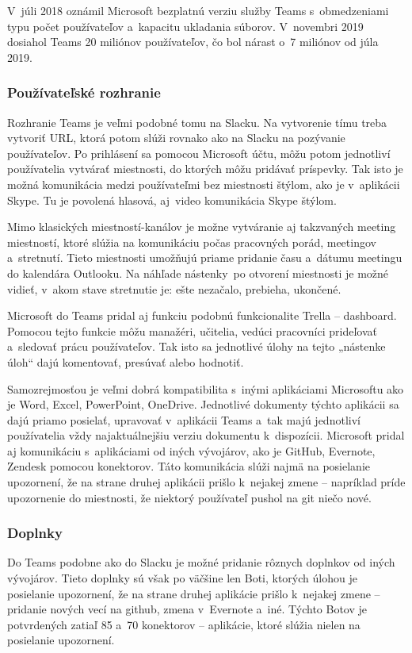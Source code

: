 \indent V júli 2018 oznámil Microsoft bezplatnú verziu služby Teams s obmedzeniami typu počet používateľov a kapacitu ukladania súborov. V novembri 2019 dosiahol Teams 20 miliónov používateľov, čo bol nárast o 7 miliónov od júla 2019. 
\subsubsection{Používateľské rozhranie}
\indent Rozhranie Teams je veľmi podobné tomu na Slacku. Na vytvorenie tímu treba vytvoriť URL, ktorá potom slúži rovnako ako na Slacku na pozývanie používateľov. Po prihlásení sa pomocou Microsoft účtu, môžu potom jednotliví používatelia vytvárať miestnosti, do ktorých môžu pridávať príspevky. Tak isto je možná komunikácia medzi používateľmi bez miestnosti štýlom, ako je v aplikácii Skype. Tu je povolená hlasová, aj video komunikácia Skype štýlom. 

\indent Mimo klasických miestností-kanálov je možne vytváranie aj takzvaných meeting miestností, ktoré slúžia na komunikáciu počas pracovných porád, meetingov a stretnutí. Tieto miestnosti umožňujú priame pridanie času a dátumu meetingu do kalendára Outlooku. Na náhľade nástenky po otvorení miestnosti je možné vidieť, v akom stave stretnutie je: ešte nezačalo, prebieha, ukončené. 

\indent Microsoft do Teams pridal aj funkciu podobnú funkcionalite Trella – dashboard. Pomocou tejto funkcie môžu manažéri, učitelia, vedúci pracovníci prideľovať a sledovať prácu používateľov. Tak isto sa jednotlivé úlohy na tejto „nástenke úloh“ dajú komentovať, presúvať alebo hodnotiť.

\indent Samozrejmosťou je veľmi dobrá kompatibilita s inými aplikáciami Microsoftu ako je Word, Excel, PowerPoint, OneDrive. Jednotlivé dokumenty týchto aplikácii sa dajú priamo posielať, upravovať v aplikácii Teams a tak majú jednotliví používatelia vždy najaktuálnejšiu verziu dokumentu k dispozícii. Microsoft pridal aj komunikáciu s aplikáciami od iných vývojárov, ako je GitHub, Evernote, Zendesk pomocou konektorov. Táto komunikácia slúži najmä na posielanie upozornení, že na strane druhej aplikácii prišlo k nejakej zmene – napríklad príde upozornenie do miestnosti, že niektorý používateľ pushol na git niečo nové.  
\subsubsection{Doplnky}
\indent Do Teams podobne ako do Slacku je možné pridanie rôznych doplnkov od iných vývojárov. Tieto doplnky sú však po väčšine len Boti, ktorých úlohou je posielanie upozornení, že na strane druhej aplikácie prišlo k nejakej zmene – pridanie nových vecí na github, zmena v Evernote a iné. Týchto Botov je potvrdených zatiaľ 85 a 70 konektorov – aplikácie, ktoré slúžia nielen na posielanie upozornení. 
